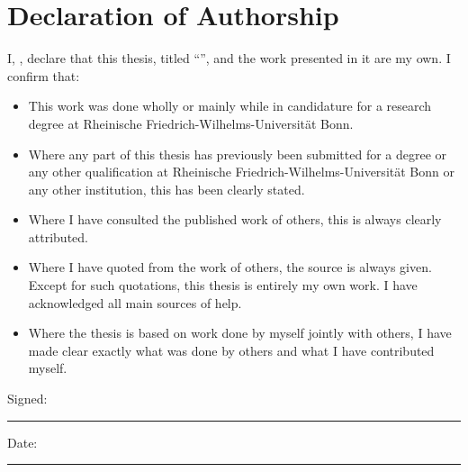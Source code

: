 \chapter*{\centering \Large Declaration of Authorship}


I, \newauthor, declare that this thesis, titled ``\newtitle'', and the work presented in it are my own. I confirm that:

\begin{itemize}
\item This work was done wholly or mainly while in candidature for a research degree at Rheinische Friedrich-Wilhelms-Universit\"{a}t Bonn.
\item Where any part of this thesis has previously been submitted for a degree or any other
qualification at Rheinische Friedrich-Wilhelms-Universit\"{a}t Bonn or any other institution, this has been clearly stated.
\item Where I have consulted the published work of others, this is always clearly attributed.
\item Where I have quoted from the work of others, the source is always given. Except for such quotations, this thesis is entirely my own work. I have acknowledged all main sources of help.
\item Where the thesis is based on work done by myself jointly with others, I have made clear exactly what was done by others and what I have contributed myself.\\[1cm]

\end{itemize}

Signed:\par
\rule[0.66\baselineskip]{12cm}{0.4pt}

\vspace{6mm}
Date:\par
\rule[0.66\baselineskip]{12cm}{0.4pt}
